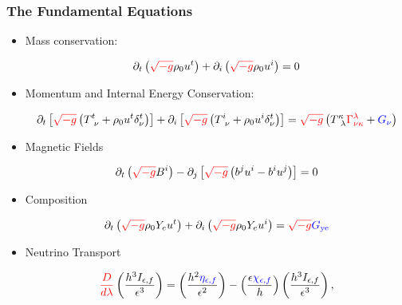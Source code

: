 \documentclass[]{beamer}
\newcommand{\paren}[1]{\left( #1 \right)}
\newcommand{\sqrbrace}[1]{\left[ #1 \right]}
\newcommand{\detg}{\sqrt{-g}}
\newcommand{\eepsilon}{\epsilon} %
\newcommand{\etanuf}{\eta_{\eepsilon,f}}
\newcommand{\Inuf}{I_{\eepsilon,f}}
\newcommand{\chinuf}{\chi_{\eepsilon,f}}
\begin{document}
\begin{frame}
  \frametitle{The Fundamental Equations}
  \begin{itemize}
  \item Mass conservation:
    \begin{small}
      \begin{displaymath}
        \partial_t \paren{{\color{red}\detg}\rho_0 u^t}
        + \partial_i\paren{{\color{red}\detg}\rho_0u^i} = 0
      \end{displaymath}
    \end{small}
  \item Momentum and Internal Energy Conservation:
    \begin{small}
      \begin{displaymath}
        \partial_t\sqrbrace{{\color{red}\detg} \paren{T^t_{\ \nu} + \rho_0u^t \delta^t_\nu}}
        + \partial_i\sqrbrace{{\color{red}\detg}\paren{T^i_{\ \nu} + \rho_0 u^i \delta^t_\nu}}
        = {\color{red}\detg} \paren{T^\kappa_{\ \lambda} {\color{red}\Gamma^\lambda_{\nu\kappa}} + {\color{blue}G_\nu}}
      \end{displaymath}
    \end{small}
  \item Magnetic Fields
    \begin{small}
      \begin{displaymath}
        \partial_t \paren{{\color{red}\detg} B^i}
        - \partial_j \sqrbrace{{\color{red}\detg}\paren{b^ju^i - b^i u^j}}
        = 0
      \end{displaymath}
    \end{small}
  \item Composition
    \begin{small}
      \begin{displaymath}
        \partial_t\paren{{\color{red}\detg}\rho_0 Y_e u^t}
        + \partial_i\paren{{\color{red}\detg}\rho_0Y_eu^i}
        = {\color{red}\detg} {\color{blue}G_{\text{ye}}}
      \end{displaymath}
    \end{small}
  \item Neutrino Transport
    \begin{small}
      \begin{displaymath}
        {\color{red}\frac{D}{d\lambda}}\paren{\frac{h^3\Inuf}{\eepsilon^3}}
        = \paren{\frac{h^2{\color{blue}\etanuf}}{\eepsilon^2}}
        - \paren{\frac{\eepsilon {\color{blue}\chinuf}}{h}} \paren{\frac{h^3\Inuf}{\eepsilon^3}},
      \end{displaymath}
    \end{small}
  \end{itemize}
\end{frame}
\end{document}
